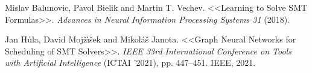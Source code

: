 \begin{thebibliography}{1}
 Mislav Balunovic, Pavol Bielik and Martin T. Vechev. <<Learning to Solve SMT Formulas>>. \textit{Advances in Neural Information Processing Systems 31} (2018).

 Jan H\r{u}la, David Moj\v{z}\'{\i}\v{s}ek and Mikol\'{a}\v{s} Janota. <<Graph Neural Networks for Scheduling of SMT Solvers>>. \textit{IEEE 33rd International Conference on Tools with Artificial Intelligence} (ICTAI '2021), pp. 447--451. IEEE, 2021.

\end{thebibliography}
